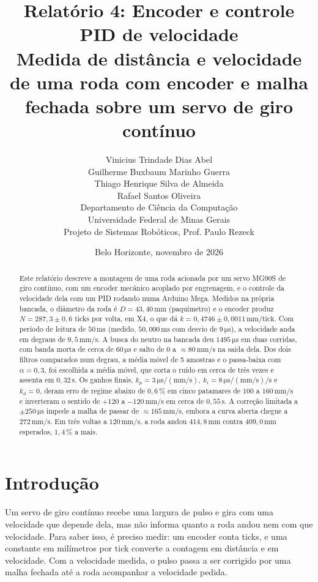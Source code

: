 \documentclass[11pt,a4paper]{article}
\title{\textbf{Relatório 4: Encoder e controle PID de velocidade}\\
[0.4em]
\large Medida de distância e velocidade de uma roda com encoder e malha fechada sobre um servo de giro contínuo}
\author{
Vinicius Trindade Dias Abel \\
Guilherme Buxbaum Marinho Guerra \\
Thiago Henrique Silva de Almeida \\
Rafael Santos Oliveira \\[0.8em]
\small Departamento de Ciência da Computação \\
\small Universidade Federal de Minas Gerais \\
\small Projeto de Sistemas Robóticos, Prof. Paulo Rezeck
}
\date{Belo Horizonte, novembro de 2026}
\newcommand{\unid}[1]{\,\mathrm{#1}}
\begin{document}
\maketitle

\begin{abstract}
\noindent
Este relatório descreve a montagem de uma roda acionada por um servo MG90S de giro contínuo, com um encoder mecânico acoplado por engrenagem, e o controle da velocidade dela com um PID rodando numa Arduino Mega. Medidos na própria bancada, o diâmetro da roda é $D = 43{,}40\unid{mm}$ (paquímetro) e o encoder produz $N = 287{,}3 \pm 0{,}6$ ticks por volta, em X4, o que dá $k = 0{,}4746 \pm 0{,}0011\unid{mm/tick}$. Com período de leitura de $50\unid{ms}$ (medido, $50{,}000\unid{ms}$ com desvio de $9\unid{\mu s}$), a velocidade anda em degraus de $9{,}5\unid{mm/s}$. A busca do neutro na bancada deu $1495\unid{\mu s}$ em duas corridas, com banda morta de cerca de $60\unid{\mu s}$ e salto de $0$ a $\approx 80\unid{mm/s}$ na saída dela. Dos dois filtros comparados num degrau, a média móvel de 5 amostras e o passa-baixa com $\alpha = 0{,}3$, foi escolhida a média móvel, que corta o ruído em cerca de três vezes e assenta em $0{,}32\unid{s}$. Os ganhos finais, $k_p = 3\unid{\mu s/(mm/s)}$, $k_i = 8\unid{\mu s/(mm/s)/s}$ e $k_d = 0$, deram erro de regime abaixo de $0{,}6\,\%$ em cinco patamares de $100$ a $160\unid{mm/s}$ e inverteram o sentido de $+120$ a $-120\unid{mm/s}$ em cerca de $0{,}55\unid{s}$. A correção limitada a $\pm 250\unid{\mu s}$ impede a malha de passar de $\approx 165\unid{mm/s}$, embora a curva aberta chegue a $272\unid{mm/s}$. Em três voltas a $120\unid{mm/s}$, a roda andou $414{,}8\unid{mm}$ contra $409{,}0\unid{mm}$ esperados, $1{,}4\,\%$ a mais.
\end{abstract}

\section{Introdução}

Um servo de giro contínuo recebe uma largura de pulso e gira com uma velocidade que depende dela, mas não informa quanto a roda andou nem com que velocidade. Para saber isso, é preciso medir: um encoder conta ticks, e uma constante em milímetros por tick converte a contagem em distância e em velocidade. Com a velocidade medida, o pulso passa a ser corrigido por uma malha fechada até a roda acompanhar a velocidade pedida.
\end{document}
